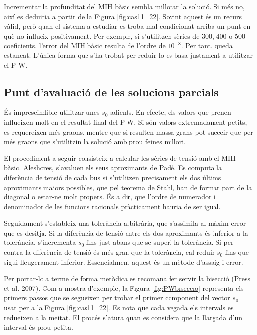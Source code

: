 Incrementar la profunditat del MIH bàsic sembla millorar la solució. Si més no, així es deduiria a partir de la Figura \ref{fig:cas11_22}. Sovint aquest és un recurs vàlid, però quan el sistema a estudiar es troba mal condicionat arriba un punt en què no influeix positivament. Per exemple, si s'utilitzen sèries de 300, 400 o 500 coeficients, l'error del MIH bàsic resulta de l'ordre de $10^{-8}$. Per tant, queda estancat. L'única forma que s'ha trobat per reduir-lo es basa justament a utilitzar el P-W.

\subsection{Punt d'avaluació de les solucions parcials}
És imprescindible utilitzar unes $s_0$ adients. En efecte, els valors que prenen influeixen molt en el resultat final del P-W. Si són valors extremadament petits, es requereixen més graons, mentre que si resulten massa grans pot succeir que per més graons que s'utilitzin la solució amb prou feines millori.

El procediment a seguir consisteix a calcular les sèries de tensió amb el MIH bàsic. Aleshores, s'avaluen els seus aproximants de Padé. Es computa la diferència de tensió de cada bus si s'utilitzen precisament els dos últims aproximants majors possibles, que pel teorema de Stahl, han de formar part de la diagonal o estar-ne molt propers. És a dir, que l'ordre de numerador i denominador de les funcions racionals pràcticament hauria de ser igual. 

Seguidament s'estableix una tolerància arbitrària, que s'assimila al màxim error que es desitja. Si la diferència de tensió entre els dos aproximants és inferior a la tolerància, s'incrementa $s_0$ fins just abans que se superi la tolerància. Si per contra la diferència de tensió és més gran que la tolerància, cal reduir $s_0$ fins que sigui lleugerament inferior. Essencialment aquest és un mètode d'assaig-i-error. 

Per portar-lo a terme de forma metòdica es recomana fer servir la bisecció (Press et al. 2007). Com a mostra d'exemple, la Figura \ref{fig:PWbiseccio} representa els primers passos que se segueixen per trobar el primer component del vector $s_0$ usat per a la Figura \ref{fig:cas11_22}. Es nota que cada vegada els intervals es redueixen a la meitat. El procés s'atura quan es considera que la llargada d'un interval és prou petita. 


